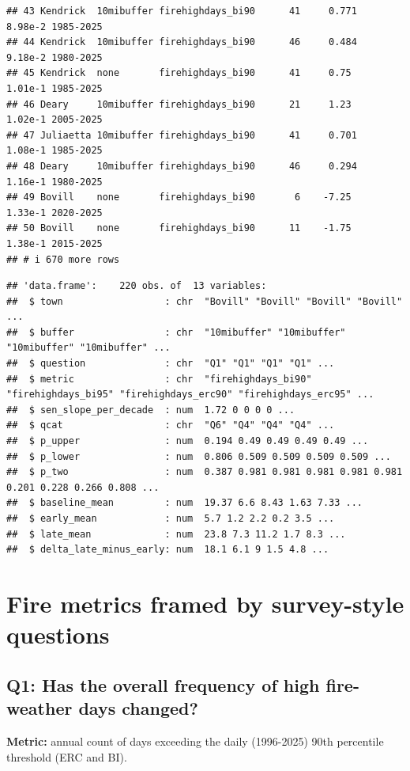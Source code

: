 \documentclass[
]{article}
\begin{document}
\begin{verbatim}
## 43 Kendrick  10mibuffer firehighdays_bi90      41     0.771   8.98e-2 1985-2025 
## 44 Kendrick  10mibuffer firehighdays_bi90      46     0.484   9.18e-2 1980-2025 
## 45 Kendrick  none       firehighdays_bi90      41     0.75    1.01e-1 1985-2025 
## 46 Deary     10mibuffer firehighdays_bi90      21     1.23    1.02e-1 2005-2025 
## 47 Juliaetta 10mibuffer firehighdays_bi90      41     0.701   1.08e-1 1985-2025 
## 48 Deary     10mibuffer firehighdays_bi90      46     0.294   1.16e-1 1980-2025 
## 49 Bovill    none       firehighdays_bi90       6    -7.25    1.33e-1 2020-2025 
## 50 Bovill    none       firehighdays_bi90      11    -1.75    1.38e-1 2015-2025 
## # i 670 more rows
\end{verbatim}

\begin{verbatim}
## 'data.frame':    220 obs. of  13 variables:
##  $ town                  : chr  "Bovill" "Bovill" "Bovill" "Bovill" ...
##  $ buffer                : chr  "10mibuffer" "10mibuffer" "10mibuffer" "10mibuffer" ...
##  $ question              : chr  "Q1" "Q1" "Q1" "Q1" ...
##  $ metric                : chr  "firehighdays_bi90" "firehighdays_bi95" "firehighdays_erc90" "firehighdays_erc95" ...
##  $ sen_slope_per_decade  : num  1.72 0 0 0 0 ...
##  $ qcat                  : chr  "Q6" "Q4" "Q4" "Q4" ...
##  $ p_upper               : num  0.194 0.49 0.49 0.49 0.49 ...
##  $ p_lower               : num  0.806 0.509 0.509 0.509 0.509 ...
##  $ p_two                 : num  0.387 0.981 0.981 0.981 0.981 0.981 0.201 0.228 0.266 0.808 ...
##  $ baseline_mean         : num  19.37 6.6 8.43 1.63 7.33 ...
##  $ early_mean            : num  5.7 1.2 2.2 0.2 3.5 ...
##  $ late_mean             : num  23.8 7.3 11.2 1.7 8.3 ...
##  $ delta_late_minus_early: num  18.1 6.1 9 1.5 4.8 ...
\end{verbatim}

\section{Fire metrics framed by survey-style
questions}\label{fire-metrics-framed-by-survey-style-questions}

\subsection{Q1: Has the overall frequency of high fire-weather days
changed?}\label{q1-has-the-overall-frequency-of-high-fire-weather-days-changed}

\textbf{Metric:} annual count of days exceeding the daily (1996-2025)
90th percentile threshold (ERC and BI).
\end{document}
